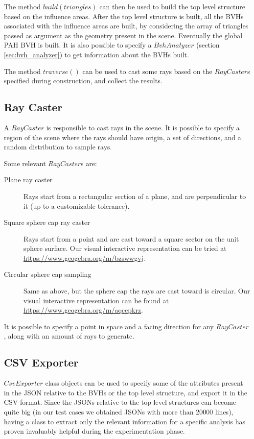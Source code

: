 \documentclass{PoliMi_MasterThesis}
\begin{document}
The method $build(triangles)$ can then be used to build the top level structure based on the influence areas. After the top level structure is built, all the BVHs associated with the influence areas are built, by considering the array of triangles passed as argument as the geometry present in the scene. Eventually the global PAH BVH is built. It is also possible to specify a $BvhAnalyzer$ (section \ref{sec:bvh_analyzer}) to get information about the BVHs built.

The method $traverse()$ can be used to cast some rays based on the $RayCaster$s specified during construction, and collect the results.

\subsection{Ray Caster} \label{ssec:ray_caster}
A $RayCaster$ is responsible to cast rays in the scene. It is possible to specify a region of the scene where the rays should have origin, a set of directions, and a random distribution to sample rays.

Some relevant $RayCaster$s are:
\begin{description}
	\item[Plane ray caster] Rays start from a rectangular section of a plane, and are perpendicular to it (up to a customizable tolerance).
	\item[Square sphere cap ray caster] Rays start from a point and are cast toward a square sector on the unit sphere surface. Our visual interactive representation can be tried at \url{https://www.geogebra.org/m/bzswwgvj}.
	\item[Circular sphere cap sampling] Same as above, but the sphere cap the rays are cast toward is circular. Our visual interactive representation can be found at \url{https://www.geogebra.org/m/aqcepkrz}.
\end{description}

It is possible to specify a point in space and a facing direction for any $RayCaster$, along with an amount of rays to generate.

\subsection{CSV Exporter}
$CsvExporter$ class objects can be used to specify some of the attributes present in the JSON relative to the BVHs or the top level structure, and export it in the CSV format. Since the JSONs relative to the top level structures can become quite big (in our test cases we obtained JSONs with more than 20000 lines), having a class to extract only the relevant information for a specific analysis has proven invaluably helpful during the experimentation phase.
\end{document}

